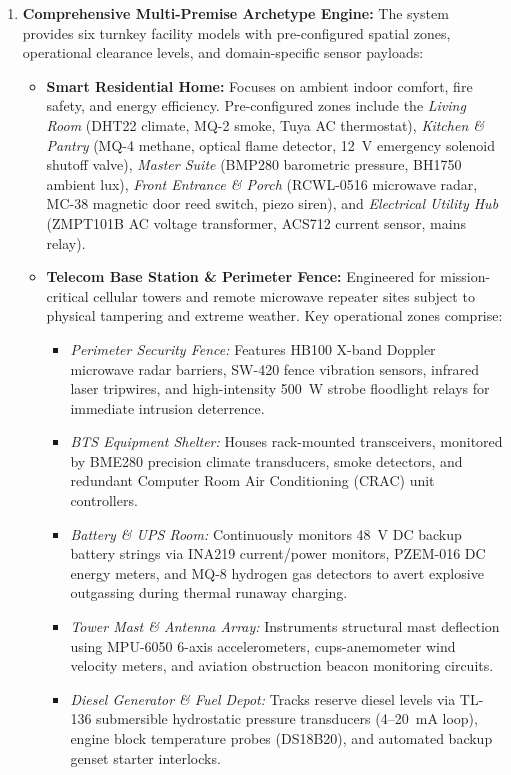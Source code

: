 \documentclass[12pt,a4paper]{article}
\begin{document}
\begin{enumerate}
    \item \textbf{Comprehensive Multi-Premise Archetype Engine:} The system provides six turnkey facility models with pre-configured spatial zones, operational clearance levels, and domain-specific sensor payloads:
    \begin{itemize}
        \item \textbf{Smart Residential Home:} Focuses on ambient indoor comfort, fire safety, and energy efficiency. Pre-configured zones include the \textit{Living Room} (DHT22 climate, MQ-2 smoke, Tuya AC thermostat), \textit{Kitchen \& Pantry} (MQ-4 methane, optical flame detector, 12~V emergency solenoid shutoff valve), \textit{Master Suite} (BMP280 barometric pressure, BH1750 ambient lux), \textit{Front Entrance \& Porch} (RCWL-0516 microwave radar, MC-38 magnetic door reed switch, piezo siren), and \textit{Electrical Utility Hub} (ZMPT101B AC voltage transformer, ACS712 current sensor, mains relay).
        
        \item \textbf{Telecom Base Station \& Perimeter Fence:} Engineered for mission-critical cellular towers and remote microwave repeater sites subject to physical tampering and extreme weather. Key operational zones comprise:
        \begin{itemize}
            \item \textit{Perimeter Security Fence:} Features HB100 X-band Doppler microwave radar barriers, SW-420 fence vibration sensors, infrared laser tripwires, and high-intensity 500~W strobe floodlight relays for immediate intrusion deterrence.
            \item \textit{BTS Equipment Shelter:} Houses rack-mounted transceivers, monitored by BME280 precision climate transducers, smoke detectors, and redundant Computer Room Air Conditioning (CRAC) unit controllers.
            \item \textit{Battery \& UPS Room:} Continuously monitors 48~V DC backup battery strings via INA219 current/power monitors, PZEM-016 DC energy meters, and MQ-8 hydrogen gas detectors to avert explosive outgassing during thermal runaway charging.
            \item \textit{Tower Mast \& Antenna Array:} Instruments structural mast deflection using MPU-6050 6-axis accelerometers, cups-anemometer wind velocity meters, and aviation obstruction beacon monitoring circuits.
            \item \textit{Diesel Generator \& Fuel Depot:} Tracks reserve diesel levels via TL-136 submersible hydrostatic pressure transducers (4--20~mA loop), engine block temperature probes (DS18B20), and automated backup genset starter interlocks.
        \end{itemize}
        

\end{itemize}
\end{enumerate}
\end{document}
